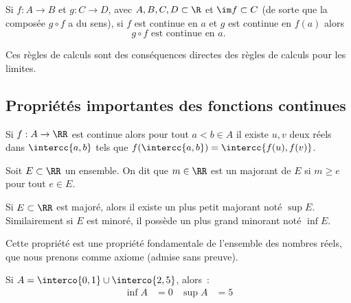 \begin{frame}
  \begin{proposition}
    Si $f : A \to B$ et $g : C \to D$, avec $A, B, C, D \subset \R$ et \(\im f \subset C\) (de sorte que la composée \(g \circ f\) a du sens), si $f$ est continue en $a$ et $g$ est continue en $f(a)$ alors
    \begin{equation*}
      g \circ f \mbox{ est continue en } a.
    \end{equation*}
  \end{proposition}

  \begin{remark*}
  Ces règles de calculs sont des conséquences directes des règles de calculs pour les limites.
\end{remark*}
\end{frame}


\subsection{Propriétés importantes des fonctions continues}
\begin{frame}%
  \begin{theorem}
    Si $f : A \to \RR$ est continue alors pour tout \(a < b \in A\) il existe \(u,v\) deux réels dans \(\intercc{a,b}\) tels que $f(\intercc{a,b}) = \intercc{f(u), f(v)}$.
  \end{theorem}
\end{frame}
\begin{frame}%
  \begin{definition}
    Soit \(E\subset\RR\) un ensemble. On dit que \(m \in \RR\) est un majorant de \(E\) si \(m \geq e\) pour tout \(e \in E\).
  \end{definition}
  \begin{theorem}
    Si \(E\subset\RR\) est majoré, alors il existe un plus petit majorant noté \(\sup E\). Similairement si \(E\) est minoré, il possède un plus grand minorant noté \(\inf E\).
  \end{theorem}\pause
  
  Cette propriété est une propriété fondamentale de l'ensemble des nombres réels, que nous prenons comme axiome (admise sans preuve).\pause

\begin{example}
  Si \(A = \interco{0,1} \cup \interco{2,5}\), alors~:
  \begin{align*}
    \inf A &= 0& \sup A &= 5
  \end{align*}
\end{example}
\end{frame}

